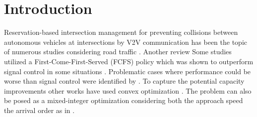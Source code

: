 \section{Introduction}

Reservation-based intersection management for preventing collisions between autonomous vehicles at intersections by V2V communication has been the topic of numerous studies considering road traffic \cite{Chen2016}. Another review \cite{Malikopoulos2018}Some studies utilized a First-Come-First-Served (FCFS) policy which was shown to outperform signal control in some situations \cite{Dresner2008}. Problematic cases where performance could be worse than signal control were identified by \cite{Levin2016}. To capture the potential capacity improvements other works have used convex optimization \cite{Dai2017}.
The problem can also be posed as a mixed-integer optimization considering both the approach speed the arrival order as in \cite{Levin2017}.  
%
%    
